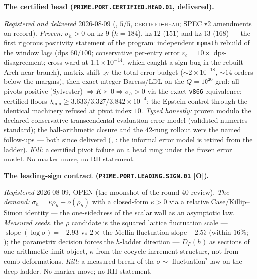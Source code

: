 \documentclass[11pt,a4paper]{article}
\begin{document}
\par\smallskip\noindent\textbf{The certified head
(\texttt{PRIME.PORT.CERTIFIED.\allowbreak HEAD.01},
delivered).}
{\sloppy
\emph{Registered and delivered} 2026-08-09
(, $5/5$,
\textsc{certified-head}; SPEC v2 amendments on record).
\emph{Proven:} $\sigma_h > 0$ on kz 9 ($h = 184$), kz 12 ($151$)
and kz 13 ($168$) --- the first rigorous positivity statement of
the program: independent \texttt{mpmath} rebuild of the window
lags (dps $60/100$; conservative per-entry error $\varepsilon_c
= 10\times$ dps-disagreement; cross-ward at $1.1\times10^{-14}$,
which caught a sign bug in the rebuilt Arch near-branch), matrix
shift by the total error budget (${\sim}2\times10^{-18}$,
${\sim}14$ orders below the margins), then exact integer
Bareiss/LDL on the $Q = 10^{20}$ grid: all pivots positive
(Sylvester) $\Rightarrow K \succ 0 \Rightarrow \sigma_h > 0$ via
the exact \texttt{v866} equivalence; certified floors
$\lambda_{\min} \ge 3.633/3.327/3.842\times10^{-4}$; the Epstein
control through the identical machinery refused at pivot index
$10$.  \emph{Typed honestly:} proven modulo the declared
conservative transcendental-evaluation error model
(validated-numerics standard); the ball-arithmetic closure and
the $42$-rung rollout were the named follow-ups --- both since
delivered (,
: the informal error
model is retired from the ladder).  \emph{Kill:} a certified
pivot failure on a head rung under the frozen error
model.  No marker move; no RH statement.\par}

\par\smallskip\noindent\textbf{The leading-sign contract
(\texttt{PRIME.PORT.LEADING.\allowbreak SIGN.01} [O]).}
{\sloppy
\emph{Registered} 2026-08-09, OPEN (the moonshot of the
round-40 review).  \emph{The demand:} $\sigma_h = \kappa\rho_h +
o(\rho_h)$ with a closed-form $\kappa > 0$ via a relative
Case/Killip--Simon identity --- the one-sidedness of the scalar
wall as an asymptotic law.  \emph{Measured seeds:} the $\rho$
candidate is the squared lattice fluctuation scale ---
$\operatorname{slope}(\log\sigma) = -2.93$ vs $2\times$ the
Mellin fluctuation slope $-2.53$ (within $16\%$;
); the parametrix decision
forces the $h$-ladder direction --- $D_P(h)$ as sections of one
arithmetic limit object, $\kappa$ from the cocycle increment
structure, not from comb deformations.  \emph{Kill:} a measured
break of the $\sigma \sim$ fluctuation$^2$ law on the deep
ladder.  No marker move; no RH statement.\par}
\end{document}
